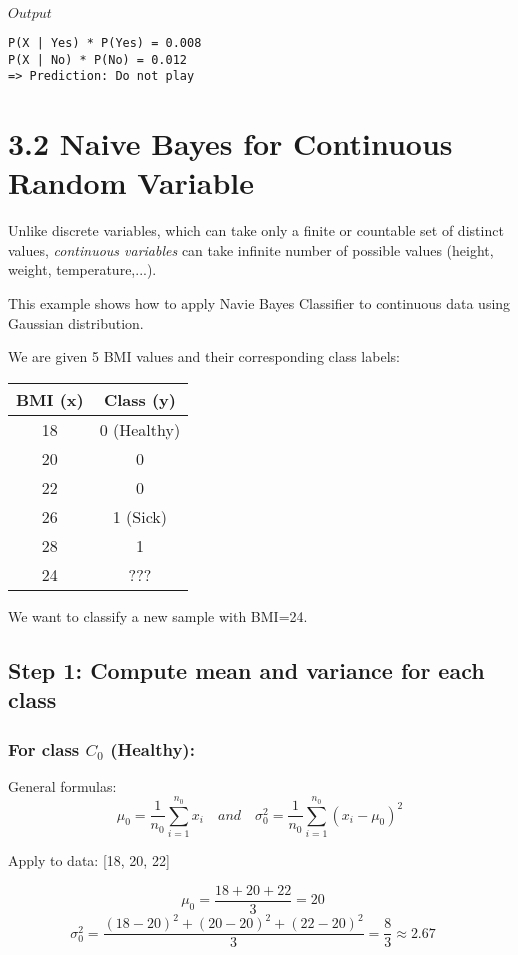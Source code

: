 \documentclass{article}
\begin{document}
$Output$

\begin{lstlisting}
P(X | Yes) * P(Yes) = 0.008
P(X | No) * P(No) = 0.012
=> Prediction: Do not play
\end{lstlisting}


\section*{3.2 Naive Bayes for Continuous Random Variable}

Unlike discrete variables, which can take only a finite or countable set of distinct values, \textit{continuous variables} can take infinite number of possible values (height, weight, temperature,...).

This example shows how to apply Navie Bayes Classifier to continuous data using Gaussian distribution.

We are given 5 BMI values and their corresponding class labels:

\begin{center}
\begin{tabular}{|c|c|}
\hline
BMI (x) & Class (y) \\
\hline
18 & 0 (Healthy) \\
20 & 0 \\
22 & 0 \\
26 & 1 (Sick) \\
28 & 1 \\
24 & ??? \\
\hline
\end{tabular}
\end{center}

We want to classify a new sample with BMI=24.

\subsection*{Step 1: Compute mean and variance for each class}
\subsubsection*{For class $C_0$ (Healthy):}

General formulas:
$$
\mu _0 = \frac{1}{n_0} \sum_{i=1}^{n_0} x_i
\quad  and \quad 
\sigma_0^2 = \frac{1}{n_0} \sum_{i=1}^{n_0} (x_i - \mu  _0)^2
$$

Apply to data: [18, 20, 22]

$$
\mu_0 = \frac{18 + 20 + 22}{3} = 20
\quad
$$
$$
\sigma _0^2 = \frac{(18 - 20)^2 + (20 - 20)^2 + (22 - 20)^2}{3} = \frac{8}{3} \approx 2.67
\quad
$$
\end{document}
